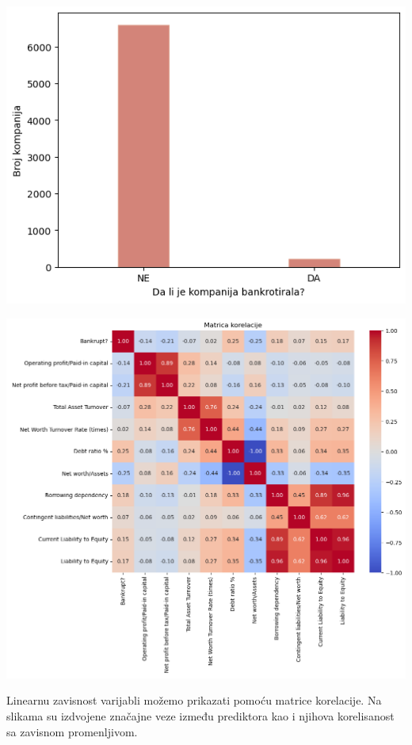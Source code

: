 \documentclass[12pt]{article}
\theoremstyle{definition}
\theoremstyle{remark}
\begin{document}
    \noindent\begin{minipage}{0.5\linewidth}
    \centering
    \includegraphics[width=0.95\linewidth]{barplot1.png}\newline
    \phantom{aaaa}
\end{minipage}
\begin{minipage}{0.5\linewidth}
    \centering
    \includegraphics[width=1\linewidth]{slika2.png}\newline
    \phantom{aaaa}
\end{minipage}

Linearnu zavisnost varijabli možemo prikazati pomoću matrice korelacije. Na slikama su izdvojene značajne veze između prediktora kao i njihova korelisanost sa zavisnom promenljivom.
\end{document}
